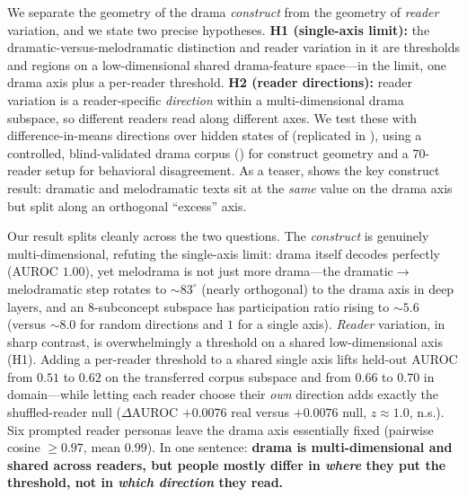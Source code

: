  We separate the geometry of the drama \emph{construct} from the geometry of \emph{reader} variation, and we state two precise hypotheses. \textbf{H1 (single-axis limit):} the dramatic-versus-melodramatic distinction and reader variation in it are thresholds and regions on a low-dimensional shared drama-feature space---in the limit, one drama axis plus a per-reader threshold. \textbf{H2 (reader directions):} reader variation is a reader-specific \emph{direction} within a multi-dimensional drama subspace, so different readers read along different axes. We test these with difference-in-means directions \citep{marks2023geometry} over hidden states of \qwenbig (replicated in \qwensmall), using a controlled, blind-validated drama corpus (\dramacorpus) for construct geometry and a 70-reader \goemotions setup for behavioral disagreement. As a teaser,  shows the key construct result: dramatic and melodramatic texts sit at the \emph{same} value on the drama axis but split along an orthogonal ``excess'' axis.

 Our result splits cleanly across the two questions. The \emph{construct} is genuinely multi-dimensional, refuting the single-axis limit: drama itself decodes perfectly (AUROC $1.00$), yet melodrama is not just more drama---the dramatic$\rightarrow$melodramatic step rotates to $\sim\!83^\circ$ (nearly orthogonal) to the drama axis in deep layers, and an 8-subconcept subspace has participation ratio rising to $\sim\!5.6$ (versus $\sim\!8.0$ for random directions and $1$ for a single axis). \emph{Reader} variation, in sharp contrast, is overwhelmingly a threshold on a shared low-dimensional axis (H1). Adding a per-reader threshold to a shared single axis lifts held-out AUROC from $0.51$ to $0.62$ on the transferred corpus subspace and from $0.66$ to $0.70$ in domain---while letting each reader choose their \emph{own} direction adds exactly the shuffled-reader null ($\Delta$AUROC $+0.0076$ real versus $+0.0076$ null, $z\!\approx\!1.0$, n.s.). Six prompted reader personas leave the drama axis essentially fixed (pairwise cosine $\geq 0.97$, mean $0.99$). In one sentence: {\bf drama is multi-dimensional and shared across readers, but people mostly differ in \emph{where} they put the threshold, not in \emph{which direction} they read.}

